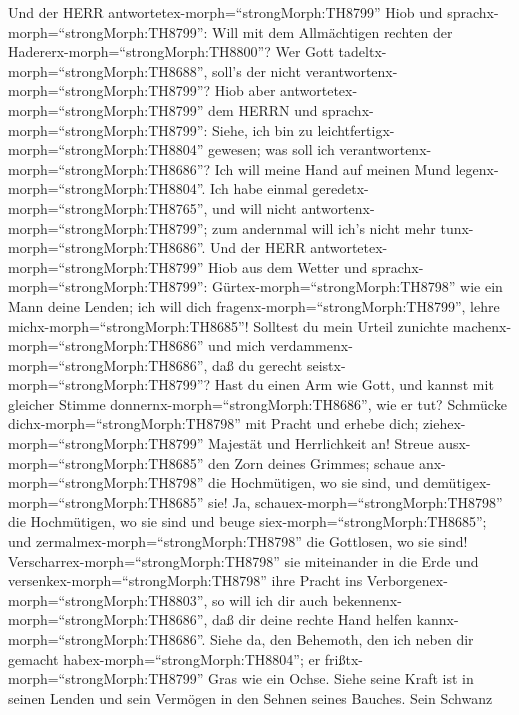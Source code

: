  Und der HERR antwortetex-morph=``strongMorph:TH8799'' Hiob
und sprachx-morph=``strongMorph:TH8799'':  Will mit dem
Allmächtigen rechten der Hadererx-morph=``strongMorph:TH8800''? Wer Gott
tadeltx-morph=``strongMorph:TH8688'', soll's der nicht
verantwortenx-morph=``strongMorph:TH8799''?  Hiob aber
antwortetex-morph=``strongMorph:TH8799'' dem HERRN und
sprachx-morph=``strongMorph:TH8799'':  Siehe, ich bin zu
leichtfertigx-morph=``strongMorph:TH8804'' gewesen; was soll ich
verantwortenx-morph=``strongMorph:TH8686''? Ich will meine Hand auf
meinen Mund legenx-morph=``strongMorph:TH8804''.  Ich habe
einmal geredetx-morph=``strongMorph:TH8765'', und will nicht
antwortenx-morph=``strongMorph:TH8799''; zum andernmal will ich's nicht
mehr tunx-morph=``strongMorph:TH8686''.  Und der HERR
antwortetex-morph=``strongMorph:TH8799'' Hiob aus dem Wetter und
sprachx-morph=``strongMorph:TH8799'': 
Gürtex-morph=``strongMorph:TH8798'' wie ein Mann deine Lenden; ich will
dich fragenx-morph=``strongMorph:TH8799'', lehre
michx-morph=``strongMorph:TH8685''!  Solltest du mein Urteil
zunichte machenx-morph=``strongMorph:TH8686'' und mich
verdammenx-morph=``strongMorph:TH8686'', daß du gerecht
seistx-morph=``strongMorph:TH8799''?  Hast du einen Arm wie
Gott, und kannst mit gleicher Stimme
donnernx-morph=``strongMorph:TH8686'', wie er tut? 
Schmücke dichx-morph=``strongMorph:TH8798'' mit Pracht und erhebe dich;
ziehex-morph=``strongMorph:TH8799'' Majestät und Herrlichkeit an!
 Streue ausx-morph=``strongMorph:TH8685'' den Zorn deines
Grimmes; schaue anx-morph=``strongMorph:TH8798'' die Hochmütigen, wo sie
sind, und demütigex-morph=``strongMorph:TH8685'' sie!  Ja,
schauex-morph=``strongMorph:TH8798'' die Hochmütigen, wo sie sind und
beuge siex-morph=``strongMorph:TH8685''; und
zermalmex-morph=``strongMorph:TH8798'' die Gottlosen, wo sie sind!
 Verscharrex-morph=``strongMorph:TH8798'' sie miteinander
in die Erde und versenkex-morph=``strongMorph:TH8798'' ihre Pracht ins
Verborgenex-morph=``strongMorph:TH8803'',  so will ich dir
auch bekennenx-morph=``strongMorph:TH8686'', daß dir deine rechte Hand
helfen kannx-morph=``strongMorph:TH8686''.  Siehe da, den
Behemoth, den ich neben dir gemacht habex-morph=``strongMorph:TH8804'';
er frißtx-morph=``strongMorph:TH8799'' Gras wie ein Ochse. 
Siehe seine Kraft ist in seinen Lenden und sein Vermögen in den Sehnen
seines Bauches.  Sein Schwanz
